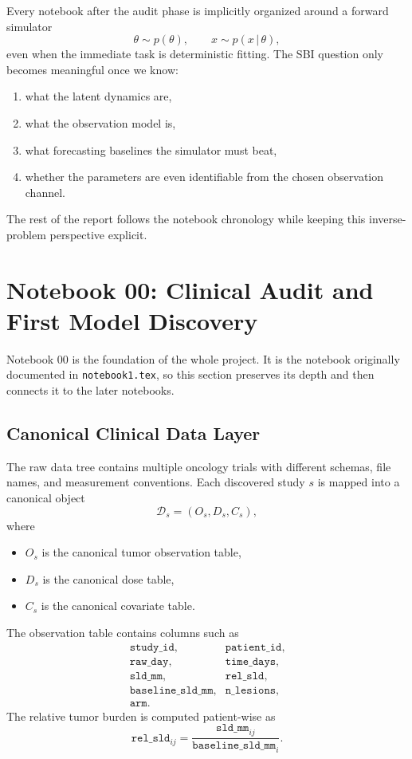\documentclass[11pt,a4paper]{article}
\newcommand{\given}{\,|\,}
\begin{document}
Every notebook after the audit phase is implicitly organized around a forward simulator
\[
    \theta\sim p(\theta),
    \qquad
    x\sim p(x\given\theta),
\]
even when the immediate task is deterministic fitting. The SBI question only becomes meaningful once we know:
\begin{enumerate}[leftmargin=2em]
    \item what the latent dynamics are,
    \item what the observation model is,
    \item what forecasting baselines the simulator must beat,
    \item whether the parameters are even identifiable from the chosen observation channel.
\end{enumerate}

The rest of the report follows the notebook chronology while keeping this inverse-problem perspective explicit.

\section{Notebook 00: Clinical Audit and First Model Discovery}

Notebook 00 is the foundation of the whole project. It is the notebook originally documented in \texttt{notebook1.tex}, so this section preserves its depth and then connects it to the later notebooks.

\subsection{Canonical Clinical Data Layer}

The raw data tree contains multiple oncology trials with different schemas, file names, and measurement conventions. Each discovered study $s$ is mapped into a canonical object
\[
    \mathcal D_s=(O_s,D_s,C_s),
\]
where
\begin{itemize}[leftmargin=2em]
    \item $O_s$ is the canonical tumor observation table,
    \item $D_s$ is the canonical dose table,
    \item $C_s$ is the canonical covariate table.
\end{itemize}

The observation table contains columns such as
\[
\begin{array}{ll}
\texttt{study\_id}, & \texttt{patient\_id},\\
\texttt{raw\_day}, & \texttt{time\_days},\\
\texttt{sld\_mm}, & \texttt{rel\_sld},\\
\texttt{baseline\_sld\_mm}, & \texttt{n\_lesions},\\
\texttt{arm}. &
\end{array}
\]
The relative tumor burden is computed patient-wise as
\[
    \texttt{rel\_sld}_{ij}
    =
    \frac{\texttt{sld\_mm}_{ij}}
    {\texttt{baseline\_sld\_mm}_{i}}.
\]
\end{document}
